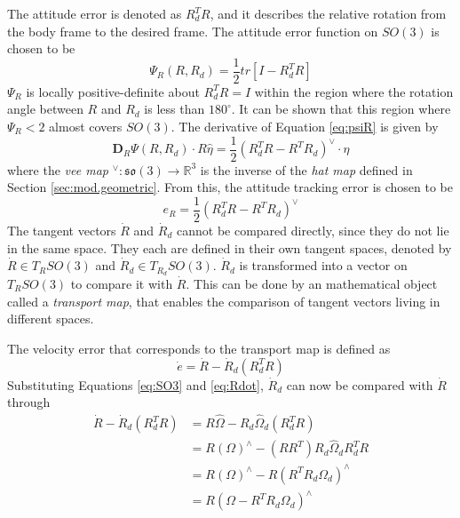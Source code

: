The attitude error is denoted as $ R^T_dR $, and it describes the relative rotation from the body frame to the desired frame. 
The  attitude error function on $ SO(3) $ is chosen to be 
\begin{equation}\label{eq:psiR}
\Psi_R(R,R_d)=\frac{1}{2}tr\left[I-R_d^TR\right]
\end{equation}
$ \Psi_R $ is locally positive-definite about $ R^T_dR=I $ within the region where the rotation angle between $ R $ and $ R_d $ is less than $ 180^\circ $. 
It can be shown that this region where $ \Psi_R<2 $ almost covers $ SO(3) $.
The derivative of Equation \ref{eq:psiR} is given by 
\begin{equation}\label{key}
\mathbf{D}_R\Psi(R,R_d)\cdot R\hat{\eta}=\frac{1}{2}(R^T_dR-R^TR_d)^\vee\cdot\eta
\end{equation}
where the \textit{vee map} $ ^\vee:\mathfrak{so}(3)\rightarrow\mathbb{R}^3 $ is the inverse of the \textit{hat map} defined in Section \ref{sec:mod.geometric}. From this, the attitude tracking error is chosen to be
\begin{equation}\label{key}
e_R=\frac{1}{2}(R_d^TR-R^TR_d)^\vee
\end{equation}
The tangent vectors $ \dot{R} $ and $ \dot{R}_d $ cannot be compared directly, since they do not lie in the same space. They each are defined in their own tangent spaces, denoted by $ \dot{R} \in T_RSO(3)$ and $ \dot{R}_d \in T_{R_d}SO(3)$. 
$ \dot{R}_d $ is transformed into a vector on $ T_RSO(3) $ to compare it with $ \dot{R} $. This can be done by an mathematical object called a \textit{transport map}, that enables the comparison of tangent vectors living in different spaces. 

The velocity error that corresponds to the transport map is defined as
\begin{equation}\label{key}
\dot{e}=\dot{R}-\dot{R}_d(R_d^TR) 
\end{equation} 
Substituting Equations \ref{eq:SO3} and \ref{eq:Rdot}, $ \dot{R}_d $ can now be compared with $ \dot{R} $ through
\begin{equation}\label{key}
\begin{aligned}
\dot{R}-\dot{R}_d(R_d^TR) &=R\hat{\Omega}-R_d\hat{\Omega}_d(R_d^TR) \\
&=R(\Omega)^\wedge-(RR^T)R_d\hat{\Omega}_dR_d^TR\\
&=R(\Omega)^\wedge-R(R^TR_d{\Omega}_d)^\wedge \\
&=R(\Omega-R^TR_d{\Omega}_d)^\wedge 
\end{aligned}
\end{equation}


